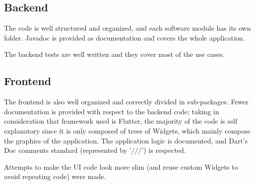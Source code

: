 \subsection{Backend}

The code is well structured and organized, and each software module has its own folder.
Javadoc is provided as documentation and covers the whole application.

The backend tests are well written and they cover most of the use cases.

\subsection{Frontend}

The frontend is also well organized and correctly divided in sub-packages.
Fewer documentation is provided with respect to the backend code; taking in consideration that framework used is Flutter, the majority of the code is self explanatory since it is only composed of trees of Widgets, which mainly compose the graphics of the application. The application logic is documented, and Dart's Doc comments standard (represented by '///') is respected.

Attempts to make the UI code look more slim (and reuse custom Widgets to avoid repeating code) were made.





